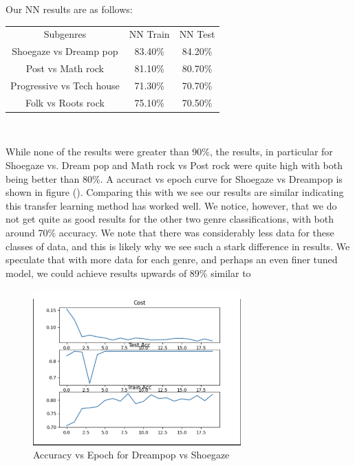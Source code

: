 \documentclass[letterpaper, 12 pt, conference]{ieeeconf}  %
\begin{document}
\par Our NN results are as follows:
\begin{center}
    
    \begin{tabular}{ |c|c|c| }
 Subgenres & NN Train & NN Test \\ 
 Shoegaze vs Dreamp pop &  83.40\% & 84.20\% \\
 Post vs Math rock & 81.10\% & 80.70\% \\
 Progressive vs Tech house & 71.30\% & 70.70\% \\
 Folk vs Roots rock & 75.10\% & 70.50\% \\
\end{tabular}\\
\end{center}


\par While none of the results were greater than 90\%, the results, in particular for Shoegaze vs. Dream pop and Math rock vs Post rock were quite high with both being better than 80\%. A accuract vs epoch curve for Shoegaze vs Dreampop is shown in figure (). Comparing this with \cite{c7} we see our results are similar indicating this transfer learning method has worked well. We notice, however, that we do not get quite as  
good results for the other two genre classifications, with both around 70\% accuracy. We note that there was considerably less data for these classes of data, and this is likely why we see such a stark difference in results. We speculate that with more data for each genre, and perhaps an even finer tuned model, we could achieve results upwards of 89\% similar to \cite{c7}


\begin{figure}
\includegraphics[width=8cm]{nn_train.png}
\caption{Accuracy vs Epoch for Dreampop vs Shoegaze}
\end{figure}


\newline \,\,
\end{document}
